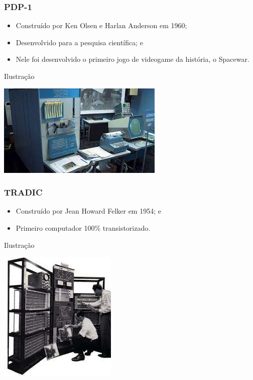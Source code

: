 \documentclass[aspectratio=169]{beamer} %
\begin{document}
\begin{frame}
	\frametitle{PDP-1}
	
	\begin{itemize}
		\item Construído por Ken Olsen e Harlan Anderson em 1960;
		\item Desenvolvido para a pesquisa científica; e
		\item Nele foi desenvolvido o primeiro jogo de videogame da história, o Spacewar.
	\end{itemize}\vfill
	
	\begin{exampleblock}{Ilustra\c cão}
		\begin{center}
			\includegraphics[scale=0.5]{img/pdp1}
		\end{center}
	\end{exampleblock}
\end{frame}

\begin{frame}
	\frametitle{TRADIC}
	
	\begin{itemize}
		\item Construído por Jean Howard Felker em 1954; e
		\item Primeiro computador 100\% transistorizado.
	\end{itemize}\vfill
	
	\begin{exampleblock}{Ilustra\c cão}
		\begin{center}
			\includegraphics[scale=0.5]{img/tradic}
		\end{center}
	\end{exampleblock}
\end{frame}
\end{document}
